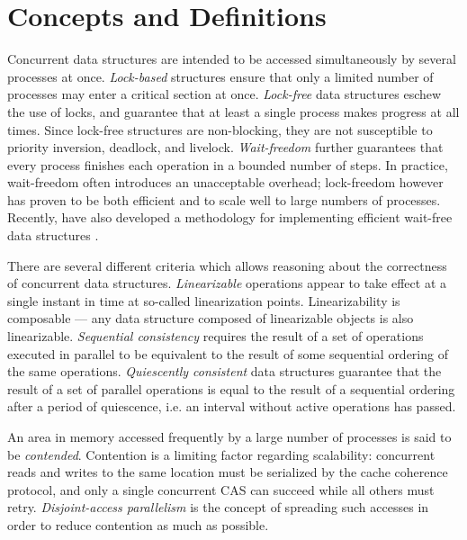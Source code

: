 \documentclass[a4paper,10pt]{article}
\begin{document}
\section{Concepts and Definitions} \label{sec:concepts}


Concurrent data structures are intended to be accessed simultaneously by several processes
at once. \emph{Lock-based} structures ensure that only a limited number of processes may enter
a critical section at once. \emph{Lock-free} data structures eschew the use of locks, and guarantee
that at least a single process makes progress at all times. Since lock-free structures are
non-blocking, they are not susceptible to priority inversion, deadlock, and livelock.
\emph{Wait-freedom} further guarantees that every process finishes each operation in a bounded number of steps. 
In practice, wait-freedom often introduces an unacceptable overhead; lock-freedom
however has proven to be both efficient and to scale well to large numbers of processes.
Recently, \citeauthor{kogan2012methodology} have also developed a methodology for implementing efficient
wait-free data structures \cite{kogan2012methodology}.


There are several different criteria which allows reasoning about the correctness of concurrent
data structures. \emph{Linearizable} \cite{herlihy1990linearizability} operations appear to take
effect at a single instant in time at so-called linearization points. Linearizability is composable ---
any data structure composed of linearizable objects is also linearizable.
\emph{Sequential consistency} \cite{lamport1979make} requires the result of a set of operations
executed in parallel to be equivalent to the result of some sequential ordering of the same
operations.
\emph{Quiescently consistent} \cite{shavit1996diffracting} data structures
guarantee that the result of a set of parallel operations is equal to the result of a sequential ordering
after a period of quiescence, i.e. an interval without active operations has passed.


An area in memory accessed frequently by a large number of processes is said to be \emph{contended}.
Contention is a limiting factor regarding scalability: concurrent reads and writes to the same
location must be serialized by the cache coherence protocol, and only a single concurrent \ac{CAS} %
can succeed while all others must retry. \emph{Disjoint-access parallelism} is the concept of
spreading such accesses in order to reduce contention as much as possible. 
\end{document}
